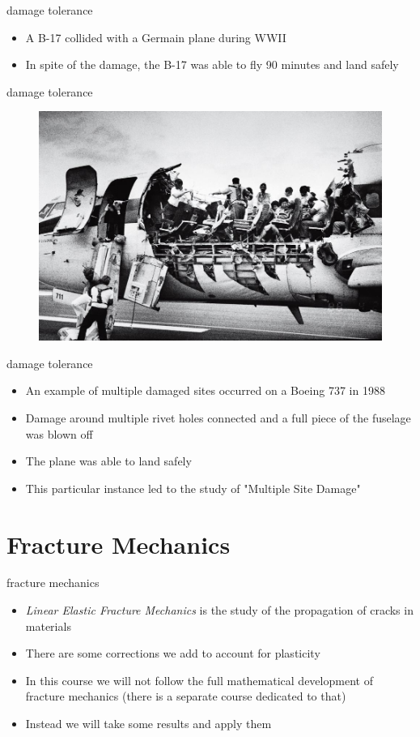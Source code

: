 \documentclass[10pt]{beamer}
\begin{document}
\begin{frame}{damage tolerance}
	\begin{itemize}
		\item A B-17 collided with a Germain plane during WWII
		\item In spite of the damage, the B-17 was able to fly 90 minutes and land safely
	\end{itemize}
\end{frame}

\begin{frame}{damage tolerance}	
\begin{figure}
\centering
\includegraphics[width=0.7\linewidth]{737}
\label{fig:737}
\end{figure}
\end{frame}

\begin{frame}{damage tolerance}
	\begin{itemize}
		\item An example of multiple damaged sites occurred on a Boeing 737 in 1988
		\item Damage around multiple rivet holes connected and a full piece of the fuselage was blown off
		\item The plane was able to land safely
		\item This particular instance led to the study of "Multiple Site Damage"
	\end{itemize}
\end{frame}

\section{Fracture Mechanics}

\begin{frame}{fracture mechanics}
	\begin{itemize}
		\item \emph{Linear Elastic Fracture Mechanics} is the study of the propagation of cracks in materials
		\item There are some corrections we add to account for plasticity
		\item In this course we will not follow the full mathematical development of fracture mechanics (there is a separate course dedicated to that)
		\item Instead we will take some results and apply them
	\end{itemize}
\end{frame}
\end{document}
